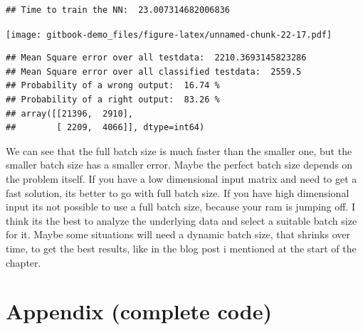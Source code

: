 \documentclass[
]{book}
\begin{document}
\begin{verbatim}
## Time to train the NN:  23.007314682006836
\end{verbatim}

\texttt{[image: gitbook-demo\_files/figure-latex/unnamed-chunk-22-17.pdf]}

\begin{verbatim}
## Mean Square error over all testdata:  2210.3693145823286
## Mean Square error over all classified testdata:  2559.5
## Probability of a wrong output:  16.74 %
## Probability of a right output:  83.26 %
## array([[21396,  2910],
##        [ 2209,  4066]], dtype=int64)
\end{verbatim}

We can see that the full batch size is much faster than the smaller one, but the smaller batch size has a smaller error. Maybe the perfect batch size depends on the problem itself. If you have a low dimensional input matrix and need to get a fast solution, its better to go with full batch size. If you have high dimensional input its not possible to use a full batch size, because your ram is jumping off. I think its the best to analyze the underlying data and select a suitable batch size for it. Maybe some situations will need a dynamic batch size, that shrinks over time, to get the best results, like in the blog post i mentioned at the start of the chapter.

\hypertarget{appendix-complete-code-4}{%
\section{Appendix (complete code)}\label{appendix-complete-code-4}}
\end{document}
